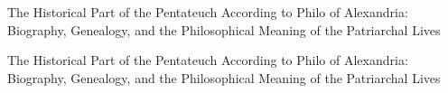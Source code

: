 \documentclass{article}
\begin{document}
\begin{pages}
\begin{Leftside}
\beginnumbering
\pstart
The Historical Part of the Pentateuch According to Philo of Alexandria: Biography, Genealogy, and the Philosophical Meaning of the Patriarchal Lives
\pend
\endnumbering
\end{Leftside}
\begin{Rightside}
\beginnumbering
\pstart
The Historical Part of the Pentateuch According to Philo of Alexandria: Biography, Genealogy, and the Philosophical Meaning of the Patriarchal Lives
\pend
\endnumbering
\end{Rightside}
\end{pages}
\Pages
\end{document}
